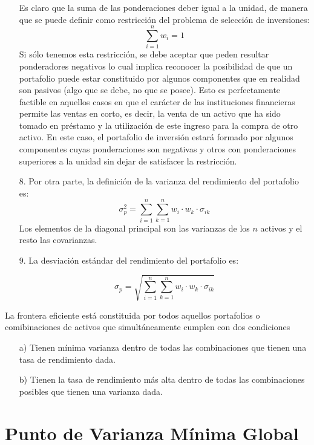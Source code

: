 \documentclass[12pt]{book} %
\begin{document}
\begin{itemize}
Es claro que la suma de las ponderaciones deber igual a la unidad, de manera que se puede definir como restricción del problema de selección de inversiones:
\begin{equation}\label{eq8}
\sum_{i=1}^{n}w_i=1
\end{equation}
Si sólo tenemos esta restricción, se debe aceptar que peden resultar ponderadores negativos lo cual implica reconocer la posibilidad de que un portafolio puede estar constituido por algunos componentes que en realidad son pasivos (algo que se debe, no que se posee). Esto es perfectamente factible en aquellos casos en que el carácter de las instituciones financieras permite las ventas en corto, es decir, la venta de un activo que ha sido tomado en préstamo y la utilización de este ingreso para la compra de otro activo. En este caso, el portafolio de inversión estará formado por algunos componentes cuyas ponderaciones son negativas y otros con ponderaciones superiores a la unidad sin dejar de satisfacer la restricción.

\item[8.] Por otra parte, la definición de la varianza del rendimiento del portafolio es:
\begin{equation}\label{eq9}
\sigma_{p}^{2}=\sum_{i=1}^{n}\sum_{k=1}^{n}w_i\cdot w_k\cdot \sigma_{ik}
\end{equation}
Los elementos de la diagonal principal son las varianzas de los $n$ activos y el resto las covarianzas.
\item[9.] La desviación estándar del rendimiento del portafolio es:

\begin{equation}\label{eq10}
\sigma_{p}=\sqrt{\sum_{i=1}^{n}\sum_{k=1}^{n}w_i\cdot w_k\cdot \sigma_{ik}}
\end{equation}
\end{itemize}
La frontera eficiente está constituida por todos aquellos portafolios o comibinaciones de activos que simultáneamente cumplen con dos condiciones
\begin{itemize}
\item[a)] Tienen mínima varianza dentro de todas las combinaciones que tienen una tasa de rendimiento dada.
\item[b)] Tienen la tasa de rendimiento más alta dentro de todas las combinaciones posibles que tienen una varianza dada. 
\end{itemize}

\section{Punto de Varianza Mínima Global}
\end{document}
